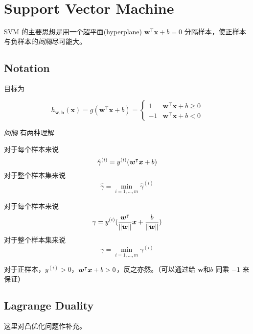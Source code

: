 \section{Support Vector Machine}
	SVM 的主要思想是用一个超平面(hyperplane) $ \bm{w}^\intercal \bm{x} + b = 0 $ 分隔样本，使正样本与负样本的\emph{间隔}尽可能大。
	
	\subsection{Notation}
	目标为
	\begin{df}
		\begin{equation*}
			h_{\bm{w},\bm{b}} (\bm{x}) = g( \bm{w}^\intercal \bm{x} + b ) = 
			\begin{cases}
				1 	& \bm{w}^\intercal \bm{x} + b \geq 0 \\
				-1 	& \bm{w}^\intercal \bm{x} + b < 0
			\end{cases}
		\end{equation*}			
	\end{df}
	
	
	\emph{间隔} 有两种理解
	\begin{df}
		对于每个样本来说
		\begin{equation*}
			\hat{\gamma}^{(i)} = y^{(i)} (\bm{w^}\intercal \bm{x} + b)
		\end{equation*}
		对于整个样本集来说
		\begin{equation*}
			\hat{\gamma} = \min_{i=1,\ldots,m}{\hat{\gamma}^{(i)}}
		\end{equation*}
	\end{df}
	\begin{df}
		对于每个样本来说
		\begin{equation*}
			\gamma = y^{(i)} (\frac{\bm{w^}\intercal}{\| \bm{w} \|} \bm{x} + \frac{b}{\| \bm{w} \|})			
		\end{equation*}
		对于整个样本集来说
			\begin{equation*}
				\gamma = \min_{i=1,\ldots,m}{\gamma^{(i)}}
			\end{equation*}	
	\end{df}
	
	对于正样本，$ y^{(i)} > 0 $，$ \bm{w^}\intercal \bm{x} + b > 0$，反之亦然。（可以通过给 $ \bm{w} \text{和} b$ 同乘 $ -1 $ 来保证）

	\subsection{Lagrange Duality}
	这里对凸优化问题作补充。
	
